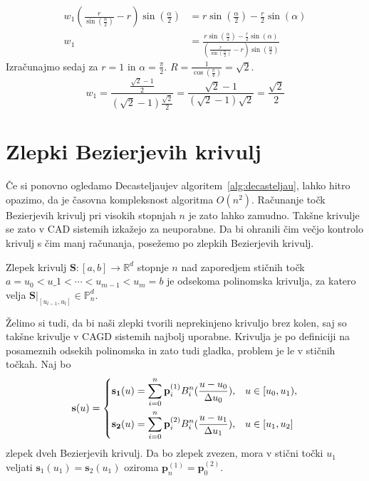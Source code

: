 \documentclass[isrm2, tisk]{fmfdelo}
\newcommand{\R}{\mathbb R}
\newcommand{\Pn}{\mathbb P_n}
\newcommand{\p}{\textbf{p}}
\begin{document}
    \begin{align*}
        w_1\left(\frac{r}{\sin\left(\frac{\alpha}{2}\right)}-r\right)\sin\left(\frac{\alpha}{2}\right)  &= r\sin\left(\frac{\alpha}{2}\right) - \frac{r}{2}\sin(\alpha) \\
        w_1 &= \frac{r\sin\left(\frac{\alpha}{2}\right) - \frac{r}{2}\sin(\alpha)}{\left(\frac{r}{\sin\left(\frac{\alpha}{2}\right)}-r\right)\sin\left(\frac{\alpha}{2}\right) }
    \end{align*}
    Izračunajmo sedaj za $r=1$ in $\alpha = \frac{\pi}{2}$. $R=\frac{1}{\cos\left(\frac{\pi}{4}\right)} = \sqrt{2}.$
    \[ w_1 = \frac{\frac{\sqrt{2}-1}{2}}{(\sqrt{2}-1)\frac{\sqrt{2}}{2}} = \frac{\sqrt{2}-1}{(\sqrt{2}-1)\sqrt{2}} = \frac{\sqrt{2}}{2} \]


    \section{Zlepki Bezierjevih krivulj}
    Če si ponovno ogledamo Decasteljaujev algoritem~\ref{alg:decasteljau}, lahko hitro opazimo, da je časovna kompleksnost algoritma $O(n^2)$.
    Računanje točk Bezierjevih krivulj pri visokih stopnjah $n$ je zato lahko zamudno.
    Takšne krivulje se zato v CAD sistemih izkažejo za neuporabne.
    Da bi ohranili čim večjo kontrolo krivulj s čim manj računanja, posežemo po zlepkih Bezierjevih krivulj.
    \begin{definicija}
        Zlepek krivulj  $\mathbf{S}:[a,b]\to \R^d$ stopnje $n$ nad zaporedjem stičnih točk $a=u_0 < u\_1 < \cdots < u_{m-1} < u_m = b$
        je odsekoma polinomska krivulja, za katero velja $\mathbf{S}|_{[u_{l-1},u_l]} \in \Pn^d$.
    \end{definicija}
    Želimo si tudi, da bi naši zlepki tvorili neprekinjeno krivuljo brez kolen, saj so takšne krivulje v CAGD sistemih najbolj uporabne.
    Krivulja je po definiciji na posameznih odsekih polinomska in zato tudi gladka, problem je le v stičnih točkah.
    Naj bo
    \[\mathbf{s}(u) = \begin{dcases}
                          \mathbf{s_1}(u) = \sum_{i=0}^n \p_i^{(1)}B_i^n(\frac{u-u_0}{\Delta u_0}), & u \in [u_0,u_1),  \\
                          \mathbf{s_2}(u) = \sum_{i=0}^n \p_i^{(2)}B_i^n(\frac{u-u_1}{\Delta u_1}), & u \in [u_1,u_2]
    \end{dcases}\]
    zlepek dveh Bezierjevih krivulj.
    Da bo zlepek zvezen, mora v stični točki $u_1$ veljati $\mathbf{s}_1(u_1) = \mathbf{s}_2(u_1)$ oziroma $\p_n^{(1)} = \p_0^{(2)}$.
\end{document}
